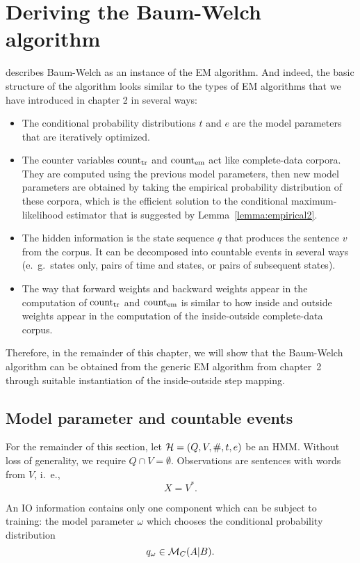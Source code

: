 \section{Deriving the Baum-Welch algorithm}

\cite{jm09} describes Baum-Welch as an instance of the EM algorithm. And
indeed, the basic structure of the algorithm looks similar to the types of EM
algorithms that we have introduced in chapter 2 in several ways:
\begin{itemize}
 \item The conditional probability distributions $t$ and $e$ are the model
  parameters that are iteratively optimized.
 \item The counter variables $\operatorname{count}_\mathrm{tr}$ and $\operatorname{count}_\mathrm{em}$ act like
  complete-data corpora. They are computed using the previous model parameters,
  then new model parameters are obtained by taking the empirical probability
  distribution of these corpora, which is the efficient solution to the
  conditional maximum-likelihood estimator that is suggested by
  Lemma~\ref{lemma:empirical2}.
 \item The hidden information is the state sequence $q$ that produces the
  sentence $v$ from the corpus. It can be decomposed into countable events in
  several ways (e.~g.~states only, pairs of time and states, or pairs of
  subsequent states).
 \item The way that forward weights and backward weights appear in the
  computation of $\operatorname{count}_\mathrm{tr}$ and $\operatorname{count}_\mathrm{em}$ is similar to how
  inside and outside weights appear in the computation of the inside-outside
  complete-data corpus.
\end{itemize}

Therefore, in the remainder of this chapter, we will show that the Baum-Welch
algorithm can be obtained from the generic EM algorithm from chapter~2 through
suitable instantiation of the inside-outside step mapping.

\subsection{Model parameter and countable events}

For the remainder of this section, let $\mathcal H = (Q,V,\#,t,e)$ be an HMM. Without
loss of generality, we require $Q\cap V=\emptyset$. Observations are sentences
with words from $V$, i.~e.,
\[
 X = V^*.
\]

An IO information contains only one component which can be subject to training:
the model parameter $\omega$ which chooses the conditional probability
distribution
\[
 q_\omega \in \mathcal M_C(A|B).
\]

